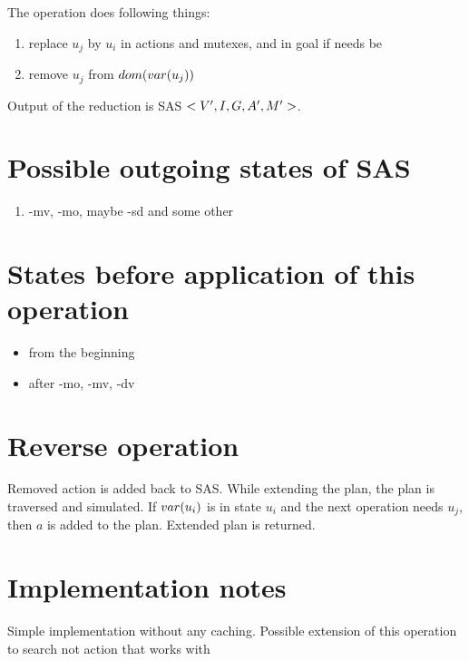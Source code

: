 	The operation does following things:
	
	\begin{enumerate}
		\item replace $u_j$ by $u_i$ in actions and mutexes, and in goal if needs be
		\item remove $u_j$ from $dom(var(u_j))$		
	\end{enumerate}
	
	Output of the reduction is SAS $<V{}', I{}, G{}, A{}', M{}'>$.
	
	
	\section{Possible outgoing states of SAS}
	\begin{enumerate}
		\item -mv, -mo, maybe -sd and some other
	\end{enumerate}
	
	\section{States before application of this operation}
	\begin{itemize}
		\item from the beginning
		\item after -mo, -mv, -dv
	\end{itemize}
	
	
	\section{Reverse operation}
	Removed action is added back to SAS. While extending the plan, the plan is traversed and simulated. If $var(u_i)$ is in state $u_i$ and the next operation needs $u_j$, then $a$ is added to the plan. Extended plan is returned.
	
	\section{Implementation notes}
	Simple implementation without any caching. Possible extension of this operation to search not action that works with 
	
	
	
	
	